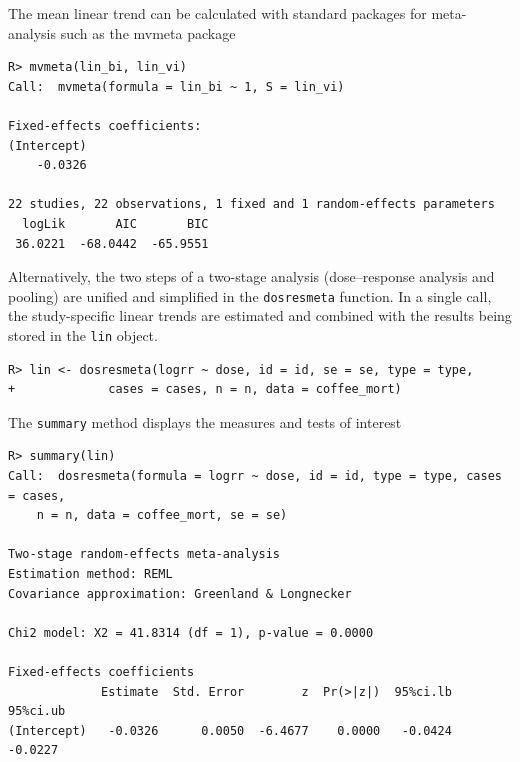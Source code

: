 \documentclass[11pt,a4paper,twoside,openany]{book}\usepackage{knitr}
\newcommand{\pkg}[1]{{\fontseries{b}\selectfont #1}}
\begin{document}
{\noindent The mean linear trend can be calculated with standard packages for meta-analysis such as the \pkg{mvmeta} package
\begin{knitrout}\footnotesize
{}\color{fgcolor}\begin{kframe}
\begin{verbatim}
R> mvmeta(lin_bi, lin_vi)
Call:  mvmeta(formula = lin_bi ~ 1, S = lin_vi)

Fixed-effects coefficients:
(Intercept)  
    -0.0326  

22 studies, 22 observations, 1 fixed and 1 random-effects parameters
  logLik       AIC       BIC  
 36.0221  -68.0442  -65.9551  
\end{verbatim}
\end{kframe}
\end{knitrout}

\noindent Alternatively, the two steps of a two-stage analysis (dose--response analysis and pooling) are unified and simplified in the \texttt{dosresmeta} function. In a single call, the study-specific linear trends are estimated and combined with the results being stored in the \texttt{lin} object. 
\begin{knitrout}\footnotesize
{}\color{fgcolor}\begin{kframe}
\begin{verbatim}
R> lin <- dosresmeta(logrr ~ dose, id = id, se = se, type = type,
+             cases = cases, n = n, data = coffee_mort)
\end{verbatim}
\end{kframe}
\end{knitrout}

\noindent The \texttt{summary} method displays the measures and tests of interest
\begin{knitrout}\footnotesize
{}\color{fgcolor}\begin{kframe}
\begin{verbatim}
R> summary(lin)
Call:  dosresmeta(formula = logrr ~ dose, id = id, type = type, cases = cases, 
    n = n, data = coffee_mort, se = se)

Two-stage random-effects meta-analysis
Estimation method: REML
Covariance approximation: Greenland & Longnecker

Chi2 model: X2 = 41.8314 (df = 1), p-value = 0.0000

Fixed-effects coefficients
             Estimate  Std. Error        z  Pr(>|z|)  95%ci.lb  95%ci.ub
(Intercept)   -0.0326      0.0050  -6.4677    0.0000   -0.0424   -0.0227



\end{verbatim}
\end{kframe}
\end{knitrout}}
\end{document}
